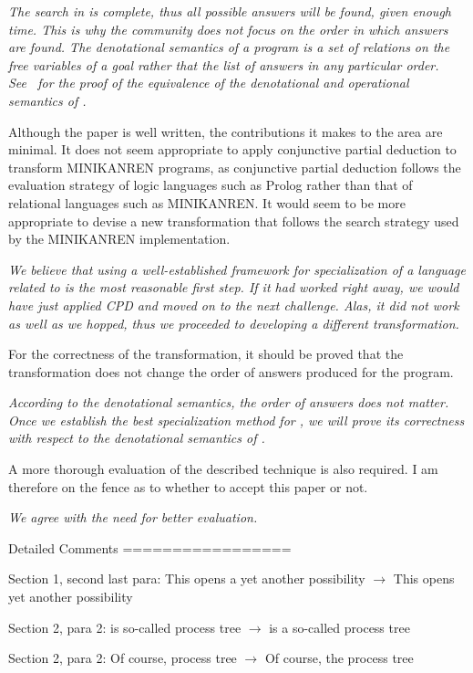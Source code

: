 \emph{The search in \mk is complete, thus all possible answers will be found, given enough time. This is why the \mk community does not focus on the order in which answers are found. The denotational semantics of a \mk program is a set of relations on the free variables of a goal rather that the list of answers in any particular order. See~\cite{rozplokhas2020certified} for the proof of the equivalence of the denotational and operational semantics of \mk.}

Although the paper is well written, the contributions it makes to the area are minimal. It does not seem appropriate to apply conjunctive partial deduction to transform MINIKANREN programs, as conjunctive partial deduction follows the evaluation strategy of logic languages such as Prolog rather than that of relational languages such as MINIKANREN. It would seem to be more appropriate to devise a new transformation that follows the search strategy used by the MINIKANREN implementation.

\emph{We believe that using a well-established framework for specialization of a language related to \mk is the most reasonable first step. If it had worked right away, we would have just applied CPD and moved on to the next challenge. Alas, it did not work as well as we hopped, thus we proceeded to developing a different transformation.}

For the correctness of the transformation, it should be proved that the transformation does not change the order of answers produced for the program.

\emph{According to the denotational semantics, the order of answers does not matter. Once we establish the best specialization method for \mk, we will prove its correctness with respect to the denotational semantics of \mk.}

A more thorough evaluation of the described technique is also required. I am therefore on the fence as to whether to accept this paper or not.

\emph{We agree with the need for better evaluation.}

Detailed Comments
=================

Section 1, second last para: This opens a yet another possibility $\to$ This opens yet another possibility

Section 2, para 2: is so-called process tree $\to$ is a so-called process tree

Section 2, para 2: Of course, process tree $\to$ Of course, the process tree

